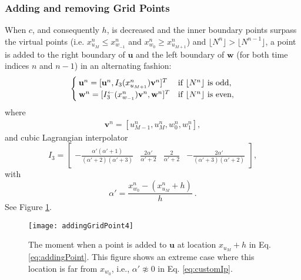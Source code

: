 \subsubsection{Adding and removing Grid Points}
When $c$, and consequently $h$, is decreased and the inner boundary points surpass the virtual points (i.e. $x_{u_M}^n \leq x_{w_{-1}}^n$ and $x_{w_0}^n \geq x_{u_{M+1}}^n$) and $\lfloor N^n\rfloor > \lfloor N^{n-1}\rfloor$, a point is added to the right boundary of $\mathbf{u}$ and the left boundary of $\mathbf{w}$ (for both time indices $n$ and $n-1$) in an alternating fashion: 
\begin{equation}\label{eq:addingPoint}
        \begin{cases}\mathbf{u}^n = [\mathbf{u}^n, I_3(x_{u_{M+1}}^n)\mathbf{v}^n]^T & \text{if $\lfloor N^n\rfloor $ is odd},\\
        \mathbf{w}^n = [I_3^\leftarrow(x_{w_{-1}}^n)\mathbf{v}^n, \mathbf{w}^n]^T & \text{if $\lfloor N^n\rfloor$ is even},
        \end{cases}
\end{equation}
where 
\begin{align*}
\mathbf{v}^n = [u_{M-1}^n, u_M^n, w_0^n, w_1^n],%
\end{align*}
and cubic Lagrangian interpolator
\begin{equation}\label{eq:customIp}
    I_3 = \begin{bmatrix} -\frac{\alpha'(\alpha'+1)}{(\alpha'+2)(\alpha'+3)} &\frac{2\alpha'}{\alpha'+2} &\frac{2}{\alpha'+2} 
    &-\frac{2\alpha'}{(\alpha'+3)(\alpha'+2)}
    \end{bmatrix},
\end{equation}
with
\begin{equation*}
    \alpha' = \frac{x_{w_0}^n - (x_{u_M}^n + h)}{h}\ .
\end{equation*}
See Figure \ref{fig:addingPoint}.

\begin{figure}[h]
    \centering
\texttt{[image: addingGridPoint4]}
\caption{\label{fig:addingPoint}{The moment when a point is added to $\mathbf{u}$ at location $x_{u_M} + h$ in Eq. \eqref{eq:addingPoint}. This figure shows an extreme case where this location is far from $x_{w_0}$, i.e., $\alpha' \not\approx 0$ in Eq. \eqref{eq:customIp}.}}
\end{figure} 

